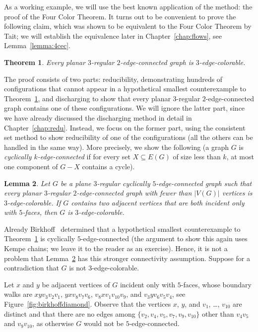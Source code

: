 \documentclass[12pt,twoside,openright,a4paper]{book}
\newtheorem{theorem}{Theorem}[chapter]
\newtheorem{lemma}[theorem]{Lemma}
\begin{document}
As a working example, we will use the best known application of the method: the proof
of the Four Color Theorem.  It turns out to be convenient to prove the following
claim, which was shown to be equivalent to the Four Color Theorem by Tait; we will
establish the equivalence later in Chapter~\ref{chap:flows}, see Lemma~\ref{lemma:4cec}.
\begin{theorem}\label{thm:planar3ec}
Every planar $3$-regular $2$-edge-connected graph is $3$-edge-colorable.
\end{theorem}
The proof consists of two parts: reducibility, demonstrating
hundreds of configurations that cannot appear in a hypothetical smallest counterexample
to Theorem~\ref{thm:planar3ec}, and discharging to show that every planar $3$-regular $2$-edge-connected
graph contains one of these configurations.  We will ignore the latter part, since
we have already discussed the discharging method in detail in Chapter~\ref{chap:redu}.
Instead, we focus on the former part, using the consistent set method to show reducibility of
one of the configurations (all the others can be handled in the same way).
More precisely, we show the following (a graph $G$ is \emph{cyclically $k$-edge-connected} if for every set $X\subseteq E(G)$ of size
less than $k$, at most one component of $G-X$ contains a cycle).
\begin{lemma}\label{lemma:birkhoffdiamond}
Let $G$ be a plane $3$-regular cyclically $5$-edge-connected graph such that every
planar $3$-regular $2$-edge-connected graph with fewer than $|V(G)|$ vertices is
$3$-edge-colorable.  If $G$ contains two adjacent vertices that are both incident only
with $5$-faces, then $G$ is $3$-edge-colorable.
\end{lemma}
Already Birkhoff~\cite{birkhof1913} determined that a hypothetical smallest counterexample
to Theorem~\ref{thm:planar3ec} is cyclically $5$-edge-connected (the argument to show this
again uses Kempe chains; we leave it to the reader as an exercise).  Hence, it is not a problem
that Lemma~\ref{lemma:birkhoffdiamond} has this stronger connectivity assumption.
Suppose for a contradiction that $G$ is not $3$-edge-colorable.

Let $x$ and $y$ be adjacent vertices of $G$ incident only with $5$-faces, whose boundary walks
are $xyv_3v_2v_1$, $yxv_8v_7v_6$, $v_8xv_1v_{10}v_9$, and $v_3yv_6v_5v_4$, see Figure~\ref{fig:birkhoffdiamond}.
Observe that the vertices $x$, $y$, and $v_1$, \ldots, $v_{10}$ are distinct and that there are no edges
among $\{v_2,v_4,v_5,v_7,v_9,v_{10}\}$ other than $v_4v_5$ and $v_9v_{10}$, as otherwise $G$ would not
be $5$-edge-connected.
\end{document}
